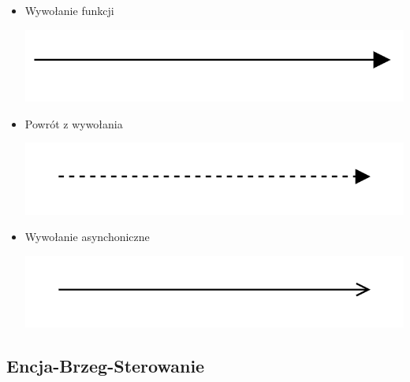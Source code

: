 \documentclass[12pt]{article}
\begin{document}
                \begin{itemize}
                    \item Wywołanie funkcji
                        
                        \begin{center}
                            \includegraphics[scale=0.35]{ooad/normal.png}
                        \end{center}

                    \item Powrót z wywołania
                        
                        \begin{center}
                            \includegraphics[scale=0.40]{ooad/return.png}
                        \end{center}

                    \item Wywołanie asynchoniczne
                        
                        \begin{center}
                            \includegraphics[scale=0.40]{ooad/async.png}
                        \end{center}

                \end{itemize}

        \subsection{Encja-Brzeg-Sterowanie}
\end{document}
